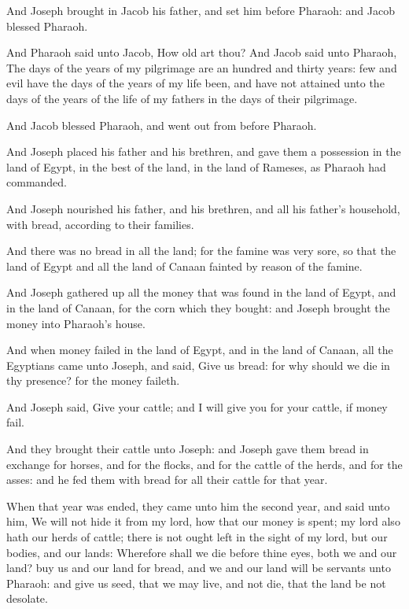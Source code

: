 \verse And Joseph brought in Jacob his father, and set him before Pharaoh: and Jacob blessed Pharaoh.

\verse And Pharaoh said unto Jacob, How old art thou?  \verse And Jacob said unto Pharaoh, The days of the years of my pilgrimage are an hundred and thirty years: few and evil have the days of the years of my life been, and have not attained unto the days of the years of the life of my fathers in the days of their pilgrimage.

\verse And Jacob blessed Pharaoh, and went out from before Pharaoh.

\verse And Joseph placed his father and his brethren, and gave them a possession in the land of Egypt, in the best of the land, in the land of Rameses, as Pharaoh had commanded.

\verse And Joseph nourished his father, and his brethren, and all his father's household, with bread, according to their families.

\verse And there was no bread in all the land; for the famine was very sore, so that the land of Egypt and all the land of Canaan fainted by reason of the famine.

\verse And Joseph gathered up all the money that was found in the land of Egypt, and in the land of Canaan, for the corn which they bought: and Joseph brought the money into Pharaoh's house.

\verse And when money failed in the land of Egypt, and in the land of Canaan, all the Egyptians came unto Joseph, and said, Give us bread: for why should we die in thy presence? for the money faileth.

\verse And Joseph said, Give your cattle; and I will give you for your cattle, if money fail.

\verse And they brought their cattle unto Joseph: and Joseph gave them bread in exchange for horses, and for the flocks, and for the cattle of the herds, and for the asses: and he fed them with bread for all their cattle for that year.

\verse When that year was ended, they came unto him the second year, and said unto him, We will not hide it from my lord, how that our money is spent; my lord also hath our herds of cattle; there is not ought left in the sight of my lord, but our bodies, and our lands: \verse Wherefore shall we die before thine eyes, both we and our land?  buy us and our land for bread, and we and our land will be servants unto Pharaoh: and give us seed, that we may live, and not die, that the land be not desolate.

